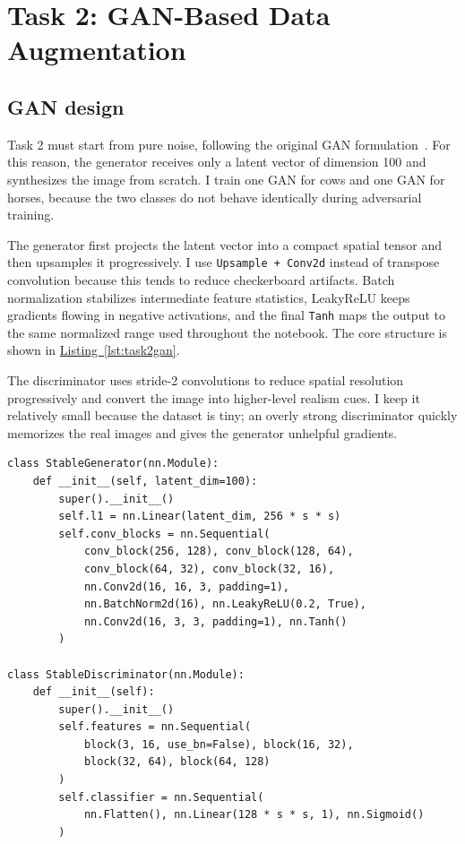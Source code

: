 \documentclass[conference]{IEEEtran}
\newcommand{\lstrefx}[1]{\hyperref[#1]{Listing~\ref*{#1}}}
\begin{document}
\section{Task 2: GAN-Based Data Augmentation}\label{sec:task2}
\subsection{GAN design}
Task 2 must start from pure noise, following the original GAN formulation~\cite{goodfellow2014gan}. For this reason, the generator receives only a latent vector of dimension 100 and synthesizes the image from scratch. I train one GAN for cows and one GAN for horses, because the two classes do not behave identically during adversarial training.

The generator first projects the latent vector into a compact spatial tensor and then upsamples it progressively. I use \texttt{Upsample + Conv2d} instead of transpose convolution because this tends to reduce checkerboard artifacts. Batch normalization stabilizes intermediate feature statistics, LeakyReLU keeps gradients flowing in negative activations, and the final \texttt{Tanh} maps the output to the same normalized range used throughout the notebook. The core structure is shown in \lstrefx{lst:task2gan}.

The discriminator uses stride-2 convolutions to reduce spatial resolution progressively and convert the image into higher-level realism cues. I keep it relatively small because the dataset is tiny; an overly strong discriminator quickly memorizes the real images and gives the generator unhelpful gradients.

\begin{lstlisting}[style=pythonstyle,caption={Core Task 2 GAN architecture.},label={lst:task2gan}]
class StableGenerator(nn.Module):
    def __init__(self, latent_dim=100):
        super().__init__()
        self.l1 = nn.Linear(latent_dim, 256 * s * s)
        self.conv_blocks = nn.Sequential(
            conv_block(256, 128), conv_block(128, 64),
            conv_block(64, 32), conv_block(32, 16),
            nn.Conv2d(16, 16, 3, padding=1),
            nn.BatchNorm2d(16), nn.LeakyReLU(0.2, True),
            nn.Conv2d(16, 3, 3, padding=1), nn.Tanh()
        )

class StableDiscriminator(nn.Module):
    def __init__(self):
        super().__init__()
        self.features = nn.Sequential(
            block(3, 16, use_bn=False), block(16, 32),
            block(32, 64), block(64, 128)
        )
        self.classifier = nn.Sequential(
            nn.Flatten(), nn.Linear(128 * s * s, 1), nn.Sigmoid()
        )
\end{lstlisting}
\end{document}
